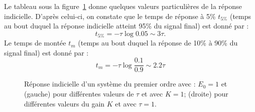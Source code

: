 Le tableau sous la figure~\cref{fig-1er_ind} donne quelques valeurs 
particulières de la réponse indicielle. D'après celui-ci, on constate 
que le temps de réponse à 5\% $t_{5\%}$ (temps au bout duquel la 
réponse indicielle atteint 95\% du signal final) est donné par :
\[
t_{5\%}=-\tau\log{0.05}\sim3\tau.
\]
Le temps de montée $t_m$ (temps au bout duquel la réponse de 10\% 
à 90\% du signal final) est donné par :
\[
t_m=-\tau\log{\dfrac{0.1}{0.9}}\sim2.2\tau
\]
\begin{figure}[!hb]
    \centering
    
    \hfill
    
    
    \caption{Réponse indicielle d'un système du premier ordre avec : $E_0=1$ 
             et (gauche) pour différentes valeurs de $\tau$ et avec $K=1$;
	     (droite) pour différentes valeurs du gain $K$ et 
             avec $\tau=1$.
             \label{fig-1er_ind}}
\end{figure}
